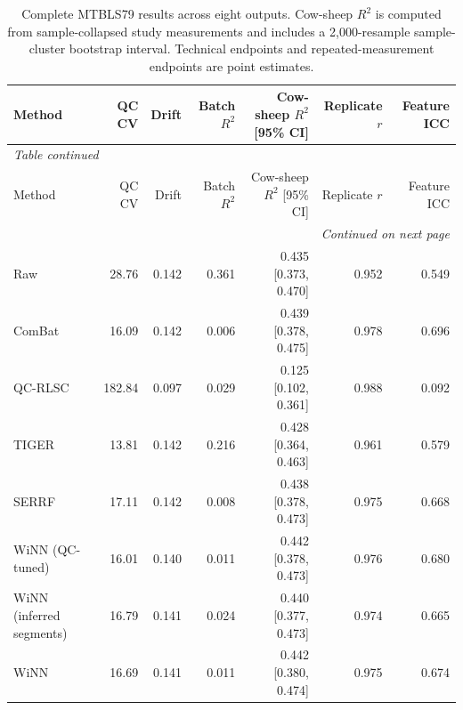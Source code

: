 \begin{landscape}
\scriptsize
\begin{longtable}{lrrrrrr}
\caption{Complete MTBLS79 results across eight outputs. Cow-sheep $R^2$ is computed from sample-collapsed study measurements and includes a 2,000-resample sample-cluster bootstrap interval. Technical endpoints and repeated-measurement endpoints are point estimates.}\label{tab:supp_mtbls79_all}\\
\toprule
Method & QC CV & Drift & Batch $R^2$ & Cow-sheep $R^2$ [95\% CI] & Replicate $r$ & Feature ICC \\
\midrule
\endfirsthead
\multicolumn{7}{l}{\textit{Table \thetable{} continued}}\\
\toprule
Method & QC CV & Drift & Batch $R^2$ & Cow-sheep $R^2$ [95\% CI] & Replicate $r$ & Feature ICC \\
\midrule
\endhead
\midrule
\multicolumn{7}{r}{\textit{Continued on next page}}\\
\endfoot
\bottomrule
\endlastfoot
Raw & 28.76 & 0.142 & 0.361 & 0.435 [0.373, 0.470] & 0.952 & 0.549 \\
ComBat & 16.09 & 0.142 & 0.006 & 0.439 [0.378, 0.475] & 0.978 & 0.696 \\
QC-RLSC & 182.84 & 0.097 & 0.029 & 0.125 [0.102, 0.361] & 0.988 & 0.092 \\
TIGER & 13.81 & 0.142 & 0.216 & 0.428 [0.364, 0.463] & 0.961 & 0.579 \\
SERRF & 17.11 & 0.142 & 0.008 & 0.438 [0.378, 0.473] & 0.975 & 0.668 \\
WiNN (QC-tuned) & 16.01 & 0.140 & 0.011 & 0.442 [0.378, 0.473] & 0.976 & 0.680 \\
WiNN (inferred segments) & 16.79 & 0.141 & 0.024 & 0.440 [0.377, 0.473] & 0.974 & 0.665 \\
WiNN & 16.69 & 0.141 & 0.011 & 0.442 [0.380, 0.474] & 0.975 & 0.674 \\
\end{longtable}
\end{landscape}
